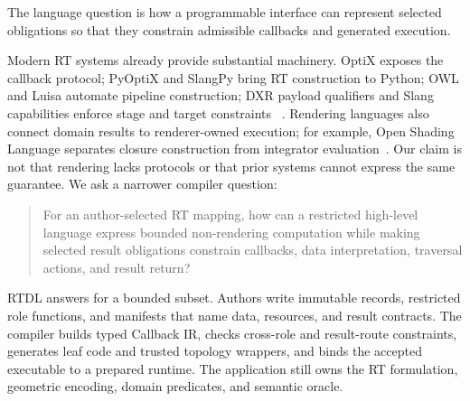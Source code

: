 \documentclass[sigplan,screen,review,anonymous]{acmart}
\newcommand{\rtdl}{\textsc{RTDL}\xspace}
\begin{document}
The language question is how a programmable interface can represent selected
obligations so that they constrain admissible callbacks and generated execution.

Modern RT systems already provide substantial machinery. OptiX exposes the
callback protocol; PyOptiX and SlangPy bring RT construction to Python; OWL and
Luisa automate pipeline construction; DXR payload qualifiers and Slang
capabilities enforce stage and target constraints
~\cite{parker2010optix,nvidiaPyOptix,slangPyRelease,slangPyDocs,nvidiaOWL,zheng2022luisa,microsoftDXRPAQ,slangCapabilities}.
Rendering languages also connect domain results to renderer-owned execution;
for example, Open Shading Language separates closure construction from
integrator evaluation~\cite{openShadingLanguageDocs}. Our claim is not that
rendering lacks protocols or that prior systems cannot express the same
guarantee. We ask a narrower compiler question:

\begin{quote}
For an author-selected RT mapping, how can a restricted high-level language
express bounded non-rendering computation while making selected result
obligations constrain callbacks, data interpretation, traversal actions, and
result return?
\end{quote}

\rtdl answers for a bounded subset. Authors write immutable records, restricted
role functions, and manifests that name data, resources, and result contracts.
The compiler builds typed Callback IR, checks cross-role and result-route
constraints, generates leaf code and trusted topology wrappers, and binds the
accepted executable to a prepared runtime. The application still owns the RT
formulation, geometric encoding, domain predicates, and semantic oracle.
\end{document}
